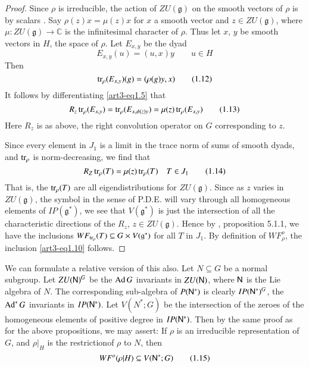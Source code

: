 \begin{proof}
Since $\rho$ is irreducible, the action of $ZU(\mathfrak{g})$ on the smooth vectors of $\rho$ is by scalars \cite{art3-Se}. Say $\rho(z)x=\mu(z)x$ for $x$ a smooth vector and $z\in ZU(\mathfrak{g})$, where $\mu:ZU(\mathfrak{g})\to \mathbb{C}$ is the infinitesimal character of $\rho$. Thus let $x$, $y$ be smooth vectors in $H$, the space of $\rho$. Let $E_{x,y}$ be the dyad
\begin{equation*}
E_{x,y}(u)=(u,x)y\qquad u\in H\tag{1.11}\label{art3-eq1.11}
\end{equation*}
Then
\begin{equation*}
\operatorname{tr}_{\rho}(E_{x,y})(g)=(\rho(g)y,x)\tag{1.12}\label{art3-eq1.12}
\end{equation*}
It follows by differentiating \eqref{art3-eq1.5} that
\begin{equation*}
R_{z}\operatorname{tr}_{\rho}(E_{x,y})=\operatorname{tr}_{\rho}(E_{x,\phi(z)y})=\mu(z)\operatorname{tr}_{\rho}(E_{x,y})\tag{1.13}\label{art3-eq1.13}
\end{equation*}
Here $R_{z}$ is as above, the right convolution operator on $G$ corresponding to $z$.

Since every element in $J_{1}$ is a limit in the trace norm of sums of smooth dyads, and $\operatorname{tr}_{\rho}$ is norm-decreasing, we find that
\begin{equation*}
R_{Z}\operatorname{tr}_{\rho}(T)=\mu(z)\operatorname{tr}_{\rho}(T)\quad T\in J_{1}\tag{1.14}\label{art3-eq1.14}
\end{equation*}
That is, the $\operatorname{tr}_{\rho}(T)$ are all eigendistributions for $ZU(\mathfrak{g})$. Since as $z$ varies in $ZU(\mathfrak{g})$, the symbol in the sense of P.D.E. will vary through all homogeneous elements of $IP(\mathfrak{g}^{*})$, we see that $V(\mathfrak{g}^{*})$ is just the intersection of all the characteristic directions of the $R_{z}$, $z\in ZU(\mathfrak{g})$. Hence by \cite{art3-D}, proposition 5.1.1, we have the inclusions $WF_{\operatorname{tr}_{\rho}}(T)\subseteq G\times V(\mathfrak{g}^{*})$ for all $T$ in $J_{1}$. By definition of $WF^{o}_{\rho}$, the inclusion \eqref{art3-eq1.10} follows.
\end{proof}

\begin{remark*}
We can formulate a relative version of this also. Let $N\subseteq G$ be a normal subgroup. Let $ZU(\mathsf{N})^{G}$ be the $\operatorname{Ad} G$ invariants in $ZU(\mathsf{N})$, where $\mathsf{N}$ is the Lie algebra of $N$. The corresponding sub-algebra of $P(\mathsf{N}^{*})$ is clearly $IP(\mathsf{N}^{*})^{G}$, the $\operatorname{Ad}^{*}G$ invariants in $IP(\mathsf{N}^{*})$. Let $V(N^{*};G)$ be the intersection of the zeroes of the homogeneous elements of positive degree in $IP(\mathsf{N}^{*})$. Then by the same proof as for the above propositions, we may assert: If $\rho$ is an irreducible representation of $G$, and $\rho|_{H}$ is the restriction\pageoriginale of $\rho$ to $N$, then
\begin{equation*}
WF^{o}(\rho|H)\subseteq V(\mathsf{N}^{*};G)\tag{1.15}\label{art3-eq1.15}
\end{equation*}
\end{remark*}

